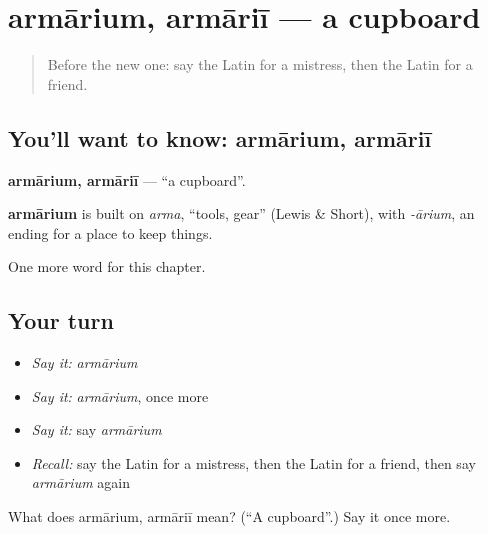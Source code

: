\section[armārium, armāriī]{armārium, armāriī — a cupboard}

\label{lesson:LA-C138-armarium}



\begin{quote}
Before the new one: say the Latin for a mistress, then the Latin for a friend.
\end{quote}

\subsection*{You'll want to know: armārium, armāriī}
\textbf{armārium, armāriī} — \textquotedblleft{}a cupboard\textquotedblright{}.

\begin{cousinweb}
\textbf{armārium} is built on \emph{arma}, \textquotedblleft{}tools, gear\textquotedblright{} (Lewis \& Short), with \emph{-ārium}, an ending for a place to keep things.
\end{cousinweb}

\begin{grammarlens}[title={What you've built}]
One more word for this chapter.
\end{grammarlens}

\subsection*{Your turn}
\begin{itemize}
\raggedright
  \item \emph{Say it:} \emph{armārium}
  \item \emph{Say it:} \emph{armārium}, once more
  \item \emph{Say it:} say \emph{armārium}
  \item \emph{Recall:} say the Latin for a mistress, then the Latin for a friend, then say \emph{armārium} again
\end{itemize}

\begin{tcolorbox}[breakable,colback=teal!4,colframe=teal!35!black,title={Before you move on}]
What does armārium, armāriī mean? (\textquotedblleft{}A cupboard\textquotedblright{}.) Say it once more.
\end{tcolorbox}

